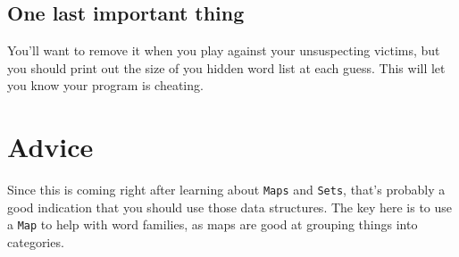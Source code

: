 \documentclass[10pt,letterpaper]{article}
\begin{document}
\subsection{One last important thing}
You'll want to remove it when you play against your unsuspecting victims, but you should print out the size of you hidden word list at each guess.
This will let you know your program is cheating.


\section{Advice}
Since this is coming right after learning about \texttt{Maps} and \texttt{Sets}, that's probably a good indication that you should use those data structures.
The key here is to use a \texttt{Map} to help with word families, as maps are good at grouping things into categories.
\end{document}
